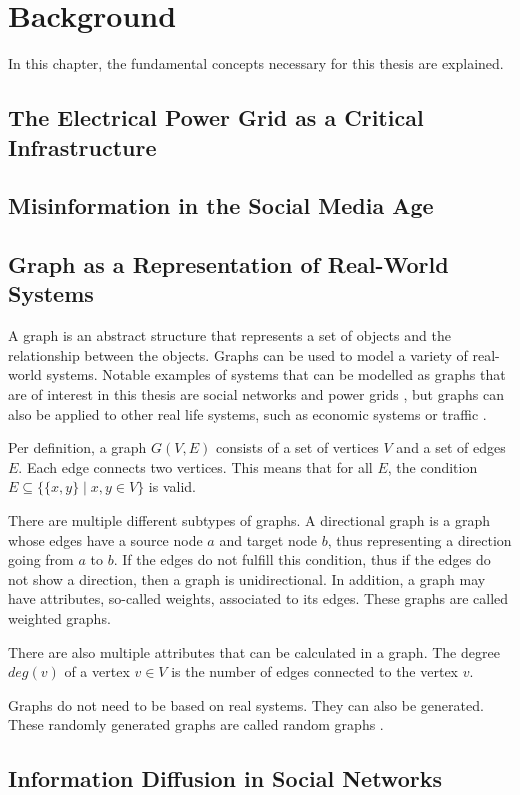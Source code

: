 \chapter{Background}
\label{background}

In this chapter, the fundamental concepts necessary for this thesis are explained.

\section{The Electrical Power Grid as a Critical Infrastructure}

\section{Misinformation in the Social Media Age}

\section{Graph as a Representation of Real-World Systems}

A graph is an abstract structure that represents a set of objects and the relationship 
between the objects. Graphs can be used to model a variety of real-world systems.
Notable examples of systems that can be modelled as graphs that are of 
interest in this thesis are social networks 
\cite{socialgraphexample} and power grids \cite{powergraphexample}, but graphs can 
also be applied to other real life systems, such as economic systems \cite{economicsgraph} 
or traffic .

Per definition, a graph $G(V, E)$ consists of a set of vertices $V$ and a 
set of edges $E$. Each edge connects two vertices. This means that for all $E$, the 
condition  $E \subseteq\{ \{x, y\} \mid x, y \in V  \}$ 
is valid.

There are multiple different subtypes of graphs. A directional graph is a graph 
whose edges have a source node $a$ and target node $b$, thus representing
a direction going from $a$ to $b$. If the edges do not fulfill this 
condition, thus if the edges do not show a direction, then a graph is unidirectional.
In addition, a graph may have attributes, so-called weights, associated to its edges.
These graphs are called weighted graphs.

There are also multiple attributes that can be calculated in a graph. The 
degree $deg(v)$ of a vertex $v \in V$ is the number of edges connected to the
vertex $v$.


Graphs do not need to be based on real systems. They can also be generated. 
These randomly generated graphs are called random graphs \cite{randomgraphs}.

\section{Information Diffusion in Social Networks}